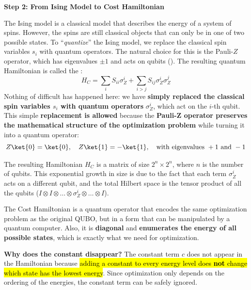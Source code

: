 \highspace
\begin{flushleft}
    \textcolor{Green3}{ \textbf{Step 2: From Ising Model to Cost Hamiltonian}}
\end{flushleft}
The Ising model is a classical model that describes the energy of a system of spins. However, the spins are still classical objects that can only be in one of two possible states. To ``\emph{quantize}'' the Ising model, we replace the classical spin variables $s_i$ with quantum operators. The natural choice for this is the Pauli-$Z$ operator, which has eigenvalues $\pm 1$ and acts on qubits (). The resulting quantum Hamiltonian is called the :
\begin{equation}\label{eq:cost-hamiltonian}
    H_C = \sum_i S_{ii} \sigma_{Z}^{i} + \sum_{i > j} S_{ij} \sigma_{Z}^{i} \sigma_{Z}^{j}
\end{equation}
Nothing of difficult has happened here: we have \textbf{simply replaced the classical spin variables $s_i$ with quantum operators} $\sigma_{Z}^{i}$, which act on the $i$-th qubit. This simple \textbf{replacement is allowed} because the \textbf{Pauli-Z operator preserves the mathematical structure of the optimization problem} while turning it into a quantum operator:
\begin{equation*}
    Z\ket{0} = \ket{0}, \quad Z\ket{1} = -\ket{1}, \quad \text{with eigenvalues } +1 \text{ and } -1
\end{equation*}

\highspace
The resulting Hamiltonian $H_C$ is a matrix of size $2^n \times 2^n$, where $n$ is the number of qubits. This exponential growth in size is due to the fact that each term $\sigma_{Z}^{i}$ acts on a different qubit, and the total Hilbert space is the tensor product of all the qubits ($I \otimes I \otimes \dots \otimes \sigma_Z^i \otimes \dots \otimes I$).

\highspace
The Cost Hamiltonian is a quantum operator that encodes the same optimization problem as the original QUBO, but in a form that can be manipulated by a quantum computer. Also, it is \textbf{diagonal} and \textbf{enumerates the energy of all possible states}, which is exactly what we need for optimization.

\highspace
\textcolor{Green3}{ \textbf{Why does the constant disappear?}} The constant term $c$ does not appear in the Hamiltonian because \hl{adding a constant to every energy level does \textbf{not} change which state has the lowest energy}. Since optimization only depends on the ordering of the energies, the constant term can be safely ignored.

